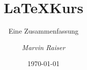 \usepackage{blindtext}

\usepackage{polyglossia} %
\setmainlanguage[babelshorthands=true]{german}

\usepackage{enumitem} %

\usepackage{mathtools}
\usepackage{amsmath}


\usepackage{hyperref} %


\title{\LaTeX Kurs}
\subtitle{Eine Zusammenfassung}
\author{\textit{Marvin Raiser}}
\date{\today}